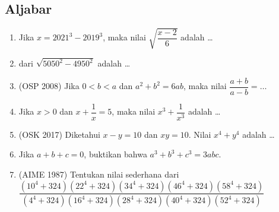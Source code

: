 \documentclass[11pt]{scrartcl}
\begin{document}
\subsection{Aljabar}
\begin{enumerate}
    \item Jika $x=2021^3-2019^3$, maka nilai $\sqrt{\dfrac{x-2}{6}}$ adalah \dots
    \item  dari $\sqrt{5050^2-4950^2}$ adalah \dots

    \item (OSP 2008) Jika $0 < b < a$ dan $a^2+b^2=6ab$, maka nilai $\dfrac{a+b}{a-b}=\dots$
    
    \item Jika $x > 0$ dan $x + \dfrac{1}{x} =  5$, maka nilai $x^3+\dfrac{1}{x^3}$ adalah \dots
    
    \item (OSK 2017) Diketahui $x-y=10$ dan $xy=10$. Nilai $x^4+y^4$ adalah \dots
    
    \item Jika $a+b+c=0$, buktikan bahwa $a^3+b^3+c^3=3abc$.

    \item (AIME 1987)
    Tentukan nilai sederhana dari $\dfrac{(10^4+324)(22^4+324)(34^4+324)(46^4+324)(58^4+324)}{(4^4+324)(16^4+324)(28^4+324)(40^4+324)(52^4+324)}$
\end{enumerate}
\end{document}
